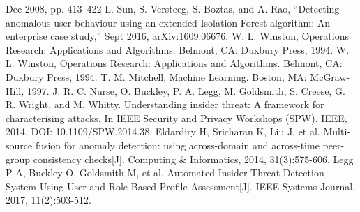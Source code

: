 \documentclass[conference]{IEEEtran}
\begin{document}
\begin{thebibliography}{00}
Dec 2008, pp. 413–422
L. Sun, S. Versteeg, S. Boztas, and A. Rao, “Detecting anomalous user behaviour using an extended Isolation Forest algorithm: An enterprise case study,” Sept 2016, arXiv:1609.06676.
W. L. Winston, Operations Research: Applications and Algorithms. Belmont, CA: Duxbury Press, 1994.
W. L. Winston, Operations Research: Applications and Algorithms. Belmont, CA: Duxbury Press, 1994.
T. M. Mitchell, Machine Learning. Boston,
MA: McGraw-Hill, 1997.
 J. R. C. Nurse, O. Buckley, P. A. Legg, M. Goldsmith, S. Creese, G. R. Wright, and M. Whitty. Understanding insider threat: A framework for characterising attacks. In IEEE Security and Privacy Workshops (SPW). IEEE, 2014. DOI: 10.1109/SPW.2014.38.
Eldardiry H, Sricharan K, Liu J, et al. Multi-source fusion for anomaly detection: using across-domain and across-time peer-group consistency checks[J]. Computing \& Informatics, 2014, 31(3):575-606.
 Legg P A, Buckley O, Goldsmith M, et al. Automated Insider Threat Detection System Using User and Role-Based Profile Assessment[J]. IEEE Systems Journal, 2017, 11(2):503-512.






\end{thebibliography}
\end{document}
